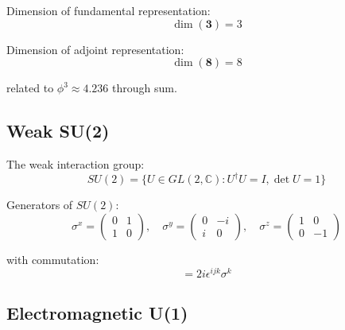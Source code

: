\begin{proposition}[SU(3) Dimension]
\label{prop:su3-dim}
Dimension of fundamental representation:
\begin{equation}
\dim(\mathbf{3}) = 3
\end{equation}

Dimension of adjoint representation:
\begin{equation}
\dim(\mathbf{8}) = 8
\end{equation}

related to $\phi^3 \approx 4.236$ through sum.
\end{proposition}

\subsection{Weak SU(2)}

\begin{definition}
\label{def:su2}
The weak interaction group:
\begin{equation}
SU(2) = \{U \in GL(2,\mathbb{C}) : U^\dagger U = I, \det U = 1\}
\end{equation}
\end{definition}

\begin{theorem}
\label{thm:pauli}
Generators of $SU(2)$:
\begin{equation}
\sigma^x = \begin{pmatrix}0 & 1 \\ 1 & 0\end{pmatrix}, \quad
\sigma^y = \begin{pmatrix}0 & -i \\ i & 0\end{pmatrix}, \quad
\sigma^z = \begin{pmatrix}1 & 0 \\ 0 & -1\end{pmatrix}
\end{equation}

with commutation:
\begin{equation}
[\sigma^i, \sigma^j] = 2i\epsilon^{ijk} \sigma^k
\end{equation}
\end{theorem}

\subsection{Electromagnetic U(1)}

